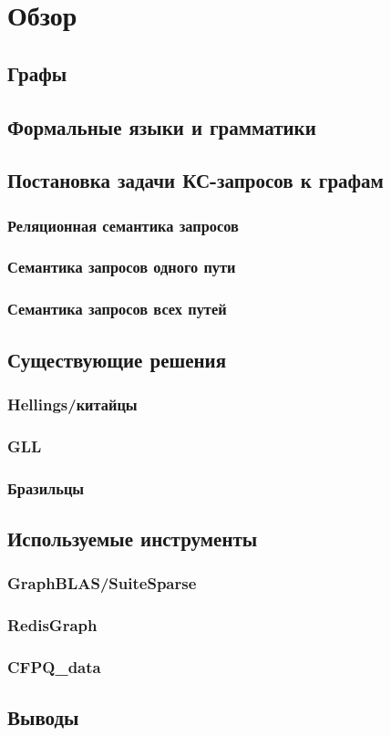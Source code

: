 \chapter{Обзор}\label{ch:ch1}

\section{Графы}\label{sec:ch1/sec1}


\section{Формальные языки и грамматики}\label{sec:ch1/sec2}

\section{Постановка задачи КС-запросов к графам}\label{sec:ch1/sec3}
\subsection{Реляционная семантика запросов}\label{subsec:ch1/sec3/sub1}
\subsection{Семантика запросов одного пути}\label{subsec:ch1/sec3/sub2}
\subsection{Семантика запросов всех путей}\label{subsec:ch1/sec3/sub3}

\section{Существующие решения}\label{sec:ch1/sec4}

\subsection{Hellings/китайцы}\label{subsec:ch1/sec4/sub1}
\subsection{GLL}\label{subsec:ch1/sec4/sub2}
\subsection{Бразильцы}\label{subsec:ch1/sec4/sub3}
\section{Используемые инструменты}\label{sec:ch1/sec5}
\subsection{GraphBLAS/SuiteSparse}\label{subsec:ch1/sec5/sub1}
\subsection{RedisGraph}\label{subsec:ch1/sec5/sub2}
\subsection{CFPQ\_data}\label{subsec:ch1/sec5/sub3}
\section{Выводы}\label{sec:ch1/sec6}

\FloatBarrier
